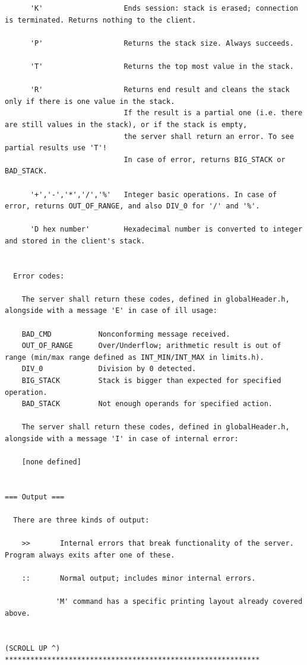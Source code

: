 \begin{lstlisting}
      'K'                   Ends session: stack is erased; connection is terminated. Returns nothing to the client.

      'P'                   Returns the stack size. Always succeeds.

      'T'                   Returns the top most value in the stack.

      'R'                   Returns end result and cleans the stack only if there is one value in the stack.
                            If the result is a partial one (i.e. there are still values in the stack), or if the stack is empty,
                            the server shall return an error. To see partial results use 'T'!
                            In case of error, returns BIG_STACK or BAD_STACK.

      '+','-','*','/','%'   Integer basic operations. In case of error, returns OUT_OF_RANGE, and also DIV_0 for '/' and '%'.

      'D hex number'        Hexadecimal number is converted to integer and stored in the client's stack.


  Error codes:

    The server shall return these codes, defined in globalHeader.h, alongside with a message 'E' in case of ill usage:

    BAD_CMD           Nonconforming message received.
    OUT_OF_RANGE      Over/Underflow; arithmetic result is out of range (min/max range defined as INT_MIN/INT_MAX in limits.h).
    DIV_0             Division by 0 detected.
    BIG_STACK         Stack is bigger than expected for specified operation.
    BAD_STACK         Not enough operands for specified action.

    The server shall return these codes, defined in globalHeader.h, alongside with a message 'I' in case of internal error:

    [none defined]


=== Output ===

  There are three kinds of output:

    >>       Internal errors that break functionality of the server. Program always exits after one of these.

    ::       Normal output; includes minor internal errors.

            'M' command has a specific printing layout already covered above.


(SCROLL UP ^)
************************************************************

\end{lstlisting}


\clearpage